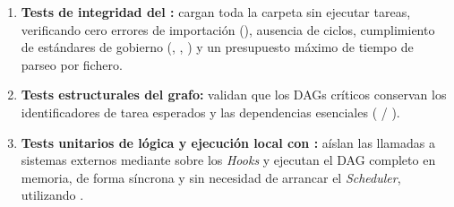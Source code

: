 \begin{enumerate}
  \item \textbf{Tests de integridad del :} cargan toda la carpeta  sin ejecutar tareas, verificando cero errores de importación (), ausencia de ciclos, cumplimiento de estándares de gobierno (, , ) y un presupuesto máximo de tiempo de parseo por fichero.
  \item \textbf{Tests estructurales del grafo:} validan que los DAGs críticos conservan los identificadores de tarea esperados y las dependencias esenciales ( / ).
  \item \textbf{Tests unitarios de lógica y ejecución local con :} aíslan las llamadas a sistemas externos mediante  sobre los \textit{Hooks} y ejecutan el DAG completo en memoria, de forma síncrona y sin necesidad de arrancar el \textit{Scheduler}, utilizando .
\end{enumerate}

